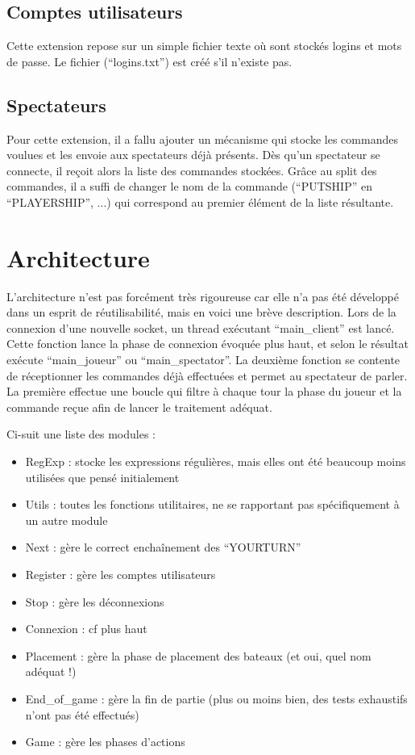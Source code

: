\documentclass[a4paper, 11pt]{report}
\begin{document}
\subsection{Comptes utilisateurs}

Cette extension repose sur un simple fichier texte où sont stockés logins et mots de passe. Le fichier (``logins.txt'') est créé s'il n'existe pas.

\subsection{Spectateurs}

Pour cette extension, il a fallu ajouter un mécanisme qui stocke les commandes voulues et les envoie aux spectateurs déjà présents. Dès qu'un spectateur se connecte, il reçoit alors la liste des commandes stockées. Grâce au split des commandes, il a suffi de changer le nom de la commande (``PUTSHIP'' en ``PLAYERSHIP'', ...) qui correspond au premier élément de la liste résultante.

\section{Architecture}

L'architecture n'est pas forcément très rigoureuse car elle n'a pas été développé dans un esprit de réutilisabilité, mais en voici une brève description.
Lors de la connexion d'une nouvelle socket, un thread exécutant ``main\_client'' est lancé. Cette fonction lance la phase de connexion évoquée plus haut, et selon le résultat exécute ``main\_joueur'' ou ``main\_spectator''. La deuxième fonction se contente de réceptionner les commandes déjà effectuées et permet au spectateur de parler. La première effectue une boucle qui filtre à chaque tour la phase du joueur et la commande reçue afin de lancer le traitement adéquat.

Ci-suit une liste des modules :
\begin{itemize}
\item RegExp : stocke les expressions régulières, mais elles ont été beaucoup moins utilisées que pensé initialement
\item Utils : toutes les fonctions utilitaires, ne se rapportant pas spécifiquement à un autre module
\item Next : gère le correct enchaînement des ``YOURTURN''
\item Register : gère les comptes utilisateurs
\item Stop : gère les déconnexions
\item Connexion : cf plus haut
\item Placement : gère la phase de placement des bateaux (et oui, quel nom adéquat !)
\item End\_of\_game : gère la fin de partie (plus ou moins bien, des tests exhaustifs n'ont pas été effectués)
\item Game : gère les phases d'actions
\end{itemize}
\end{document}
